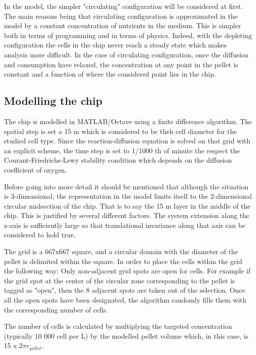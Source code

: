 \documentclass[11pt,a4paper]{article}
\begin{document}
In the model, the simpler "circulating" configuration will be considered at first. The main reasons being that circulating configuration is approximated in the model by a constant concentration of nutrients in the medium. This is simpler both in terms of programming and in terms of physics. Indeed, with the depleting configuration the cells in the chip never reach a steady state which makes analysis more difficult. In the case of circulating configuration, once the diffusion and consumption have relaxed, the concentration at any point in the pellet is constant and a function of where the considered point lies in the chip.

\subsection{Modelling the chip}
The chip is modelled in MATLAB/Octave using a finite difference algorithm. The spatial step is set a 15 \textmu m which is considered to be theh cell diameter for the studied cell type. Since the reaction-diffusion equation is solved on that grid with an explicit scheme, the time step is set to 1/1000 th of minute the respect the Courant-Friedrichs-Lewy stability condition which depends on the diffusion coefficient of oxygen.\cite{Press1992}

Before going into more detail it should be mentioned that although the situation is 3-dimensional, the representation in the model limits itself to the 2-dimensional circular midsection of the chip. That is to say the 15 \textmu m layer in the middle of the chip. This is justified by several different factors. The system extension along the z-axis is sufficiently large so that translational invariance along that axis can be considered to hold true.  

The grid is a 667x667 square, and a circular domain with the diameter of the pellet is delimited within the square. In order to place the cells within the grid the following way: Only non-adjacent grid spots are open for cells. For example if the grid spot at the center of the circular zone corresponding to the pellet is tagged as "open", then the 8 adjacent spots are taken out of the selection. Once all the open spots have been designated, the algorithm randomly fills them with the corresponding number of cells.

 The number of cells is calculated by multiplying the targeted concentration (typically 10 000 cell per \textmu L) by the modelled pellet volume which, in this case, is 15 x $2 \pi r_{pellet}$. 
 
\end{document}
